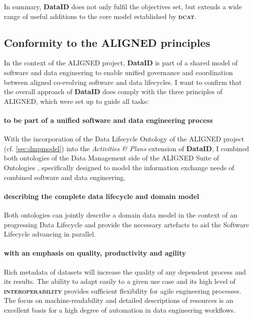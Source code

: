\documentclass[a4paper,english,twoside,BCOR1.5cm,headsepline,DIV12,appendixprefix,final,12pt]{scrbook}
\newcommand{\interoperability}{{\ttfamily\scshape\bfseries interoperability}\xspace}
\newcommand{\dataid}{{\ttfamily\bfseries DataID}\xspace}
\newcommand{\dcat}{{\scshape\bfseries dcat}\xspace}
\begin{document}
In summary, \dataid does not only fulfil the objectives set, but extends a wide range of useful additions to the core model established by \dcat. 

\subsection{Conformity to the ALIGNED principles}
\label{sec:evalaligned}

In the context of the ALIGNED project, \dataid is part of a shared model of software and data engineering to enable unified governance and coordination between aligned co-evolving software and data lifecycles.
I want to confirm that the overall approach of \dataid does comply with the three principles of ALIGNED, which were set up to guide all tasks:

\paragraph{to be part of a unified software and data engineering process}
With the incorporation of the Data Lifecycle Ontology of the ALIGNED project (cf. \cref{sec:dmpmodel}) into the \textit{Activities \& Plans} extension of \dataid, I combined both ontologies of the Data Management side of the ALIGNED Suite of Ontologies \cite{SolankiBFKDB16}, specifically designed to model the information exchange needs of combined software and data engineering.

\paragraph{describing the complete data lifecycle and domain model}
Both ontologies can jointly describe a domain data model in the context of an progressing Data Lifecycle and provide the necessary artefacts to aid the Software Lifecycle advancing in parallel.

\paragraph{with an emphasis on quality, productivity and agility}
Rich metadata of datasets will increase the quality of any dependent process and its results. The ability to adapt easily to a given use case and its high level of \interoperability provides sufficient flexibility for agile engineering processes. The focus on machine-readability and detailed descriptions of resources is an excellent basis for a high degree of automation in data engineering workflows.
\end{document}
